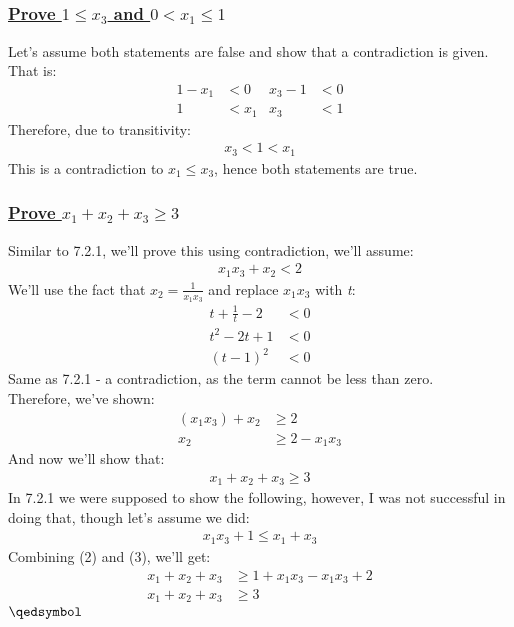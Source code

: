 \documentclass[a4paper, 12pt]{article}
\newcommand{\sub}[1]{\subsection{\underline{#1}}}
\newcommand{\subsub}[1]{\subsubsection{\underline{#1}}}
\newcommand{\eq}[1]{\begin{align*}#1\end{align*}}
\newcommand{\eqn}[1]{\begin{align}#1\end{align}}
\renewcommand{\qed}{\hfill\(\qedsymbol\)}
\begin{document}
\sub{}
\subsub{Prove $1\leq{x_3}$ and $0<x_1\leq{1}$}
Let's assume both statements are false and show that a contradiction is given.\\
That is:
\eq{
    1-x_1&<0 & x_3-1&<0\\
    1&<x_1 & x_3&<1
}
Therefore, due to transitivity:
\eq{
    x_3<1<x_1
}
This is a contradiction to $x_1\leq{x_3}$, hence both statements are true.\\
\pagebreak
\subsub{Prove $x_1+x_2+x_3\geq{3}$}
Similar to 7.2.1, we'll prove this using contradiction, we'll assume:
\eq{
    x_1x_3+x_2<2
}
We'll use the fact that $x_2=\frac{1}{x_1x_3}$ and replace $x_1x_3$ with \textit{t}:
\eq{
    t+\frac{1}{t}-2&<0\\
    t^2-2t+1&<0\\
    (t-1)^2&<0
}
Same as 7.2.1 - a contradiction, as the term cannot be less than zero.\\
Therefore, we've shown:
\eqn{
    (x_1x_3)+x_2&\geq{2}\\
    x_2&\geq 2-x_1x_3
}
And now we'll show that:
\eq{
    x_1+x_2+x_3\geq{3}
}
In 7.2.1 we were supposed to show the following, however, I was not successful in doing that, though let's assume we did:
\eqn{
    x_1x_3+1\leq x_1+x_3
}
Combining (2) and (3), we'll get:
\eq{
    x_1+x_2+x_3&\geq 1+x_1x_3-x_1x_3+2\\
    x_1+x_2+x_3&\geq{3}
}
\qed



\end{document}
